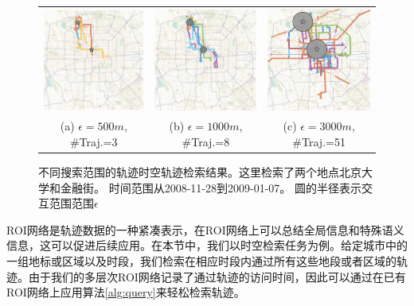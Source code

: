 \tabcolsep=1pt
\begin{figure}[!t]
\centering
\begin{tabular}{ccc}
\includegraphics[width=48mm]{pics/q500.eps}&
\includegraphics[width=48mm]{pics/q1000.eps}&
\includegraphics[width=48mm]{pics/q3000.eps}\\
(a) $\epsilon = 500m$, \#Traj.=3 & (b) $\epsilon = 1000m$, \#Traj.=8 & (c) $\epsilon = 3000m$, \#Traj.=51  \\
\end{tabular}
\caption{不同搜索范围的轨迹时空轨迹检索结果。这里检索了两个地点北京大学和金融街。 时间范围从2008-11-28到2009-01-07。 圆的半径表示交互范围范围$\epsilon$
}
\label{fig:queryResult}
\vspace{2mm}
\end{figure}

ROI网络是轨迹数据的一种紧凑表示，在ROI网络上可以总结全局信息和特殊语义信息，这可以促进后续应用。在本节中，我们以时空检索任务为例。给定城市中的一组地标或区域以及时段，我们检索在相应时段内通过所有这些地段或者区域的轨迹。由于我们的多层次ROI网络记录了通过轨迹的访问时间，因此可以通过在已有ROI网络上应用算法\ref{alg:query}来轻松检索轨迹。

